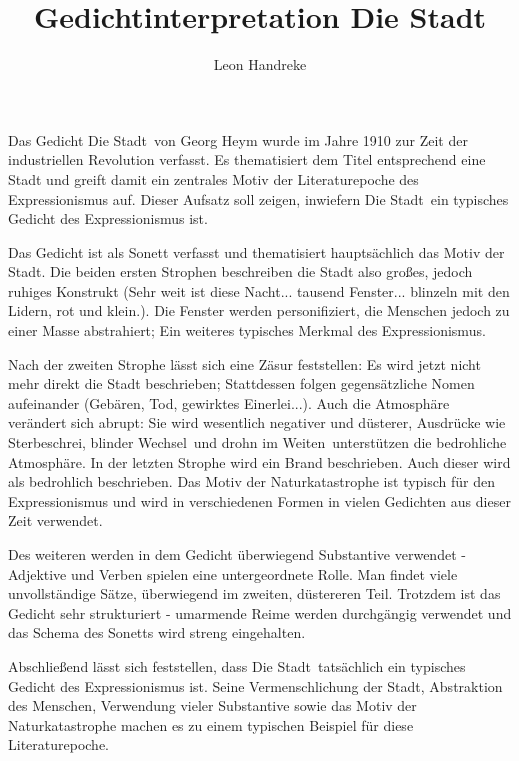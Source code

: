 \documentclass[11pt]{article}
\title{Gedichtinterpretation \dq Die Stadt\dq }
\author{Leon Handreke}
\date{}                                           %
\begin{document}
\maketitle

\selectfont
\doublespacing

Das Gedicht \dq Die Stadt\dq\  von Georg Heym wurde im Jahre 1910 zur Zeit der industriellen Revolution verfasst. Es thematisiert  dem Titel entsprechend eine Stadt und greift damit ein zentrales Motiv der Literaturepoche des Expressionismus auf. Dieser Aufsatz soll zeigen, inwiefern \dq Die Stadt\dq\  ein typisches Gedicht des Expressionismus ist.

Das Gedicht ist als Sonett verfasst und thematisiert hauptsächlich das Motiv der Stadt. Die beiden ersten Strophen beschreiben die Stadt also großes, jedoch ruhiges Konstrukt (\dq Sehr weit ist diese Nacht... tausend Fenster... blinzeln mit den Lidern, rot und klein.\dq ). Die Fenster werden personifiziert, die Menschen jedoch zu einer Masse abstrahiert; Ein weiteres typisches Merkmal des Expressionismus.

Nach der zweiten Strophe lässt sich eine Zäsur feststellen: Es wird jetzt nicht mehr direkt die Stadt beschrieben; Stattdessen folgen gegensätzliche Nomen aufeinander (\dq Gebären, Tod, gewirktes Einerlei...\dq ). Auch die Atmosphäre verändert sich abrupt: Sie wird wesentlich negativer und düsterer, Ausdrücke wie \dq Sterbeschrei\dq , \dq blinder Wechsel\dq\  und \dq drohn im Weiten\dq\  unterstützen die bedrohliche Atmosphäre. In der letzten Strophe wird ein Brand beschrieben. Auch dieser wird als bedrohlich beschrieben. Das Motiv der Naturkatastrophe ist typisch für den Expressionismus und wird in verschiedenen Formen in vielen Gedichten aus dieser Zeit verwendet.

Des weiteren werden in dem Gedicht überwiegend Substantive verwendet - Adjektive und Verben spielen eine untergeordnete Rolle. Man findet viele unvollständige Sätze, überwiegend im zweiten, düstereren Teil. Trotzdem ist das Gedicht sehr strukturiert - umarmende Reime werden durchgängig verwendet und das Schema des Sonetts wird streng eingehalten.

Abschließend lässt sich feststellen, dass \dq Die Stadt\dq\  tatsächlich ein typisches Gedicht des Expressionismus ist. Seine Vermenschlichung der Stadt, Abstraktion des Menschen, Verwendung vieler Substantive sowie das Motiv der Naturkatastrophe machen es zu einem typischen Beispiel für diese Literaturepoche.
\end{document}
